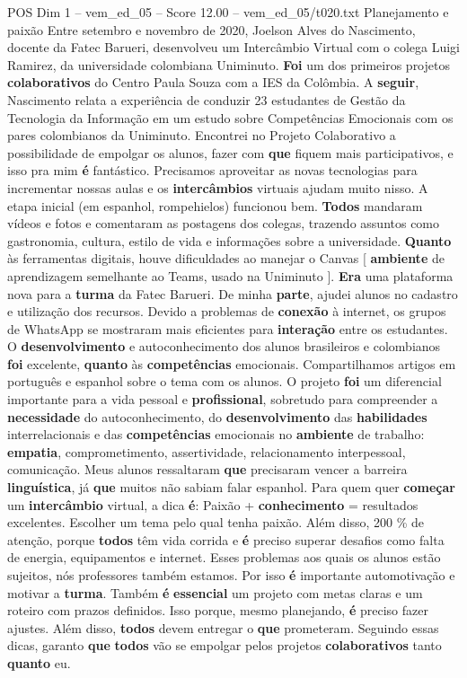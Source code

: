 \begin{textsample}{POS Dim 1 – vem\_ed\_05 – Score 12.00 – vem\_ed\_05/t020.txt}  \label{ex:f1_pos_103}
Planejamento e paixão Entre setembro e novembro de 2020, Joelson Alves do Nascimento, docente da Fatec Barueri, desenvolveu um Intercâmbio Virtual com o colega Luigi Ramirez, da universidade colombiana Uniminuto. \textbf{Foi} um dos primeiros projetos \textbf{colaborativos} do Centro Paula Souza com a IES da Colômbia.
A \textbf{seguir}, Nascimento relata a experiência de conduzir 23 estudantes de Gestão da Tecnologia da Informação em um estudo sobre Competências Emocionais com os pares colombianos da Uniminuto.
Encontrei no Projeto Colaborativo a possibilidade de empolgar os alunos, fazer com \textbf{que} fiquem mais participativos, e isso pra mim \textbf{é} fantástico.
Precisamos aproveitar as novas tecnologias para incrementar nossas aulas e os \textbf{intercâmbios} virtuais ajudam muito nisso.
A etapa inicial (em espanhol, rompehielos) funcionou bem. \textbf{Todos} mandaram vídeos e fotos e comentaram as postagens dos colegas, trazendo assuntos como gastronomia, cultura, estilo de vida e informações sobre a universidade. \textbf{Quanto} às ferramentas digitais, houve dificuldades ao manejar o Canvas [ \textbf{ambiente} de aprendizagem semelhante ao Teams, usado na Uniminuto ]. \textbf{Era} uma plataforma nova para a \textbf{turma} da Fatec Barueri.
De minha \textbf{parte}, ajudei alunos no cadastro e utilização dos recursos.
Devido a problemas de \textbf{conexão} à internet, os grupos de WhatsApp se mostraram mais eficientes para \textbf{interação} entre os estudantes.
O \textbf{desenvolvimento} e autoconhecimento dos alunos brasileiros e colombianos \textbf{foi} excelente, \textbf{quanto} às \textbf{competências} emocionais.
Compartilhamos artigos em português e espanhol sobre o tema com os alunos.
O projeto \textbf{foi} um diferencial importante para a vida pessoal e \textbf{profissional}, sobretudo para compreender a \textbf{necessidade} do autoconhecimento, do \textbf{desenvolvimento} das \textbf{habilidades} interrelacionais e das \textbf{competências} emocionais no \textbf{ambiente} de trabalho: \textbf{empatia}, comprometimento, assertividade, relacionamento interpessoal, comunicação.
Meus alunos ressaltaram \textbf{que} precisaram vencer a barreira \textbf{linguística}, já \textbf{que} muitos não sabiam falar espanhol.
Para quem quer \textbf{começar} um \textbf{intercâmbio} virtual, a dica \textbf{é}: Paixão + \textbf{conhecimento} = resultados excelentes.
Escolher um tema pelo qual tenha paixão.
Além disso, 200 \% de atenção, porque \textbf{todos} têm vida corrida e \textbf{é} preciso superar desafios como falta de energia, equipamentos e internet.
Esses problemas aos quais os alunos estão sujeitos, nós professores também estamos.
Por isso \textbf{é} importante automotivação e motivar a \textbf{turma}.
Também \textbf{é} \textbf{essencial} um projeto com metas claras e um roteiro com prazos definidos.
Isso porque, mesmo planejando, \textbf{é} preciso fazer ajustes.
Além disso, \textbf{todos} devem entregar o \textbf{que} prometeram.
Seguindo essas dicas, garanto \textbf{que} \textbf{todos} vão se empolgar pelos projetos \textbf{colaborativos} tanto \textbf{quanto} eu.


\end{textsample}
